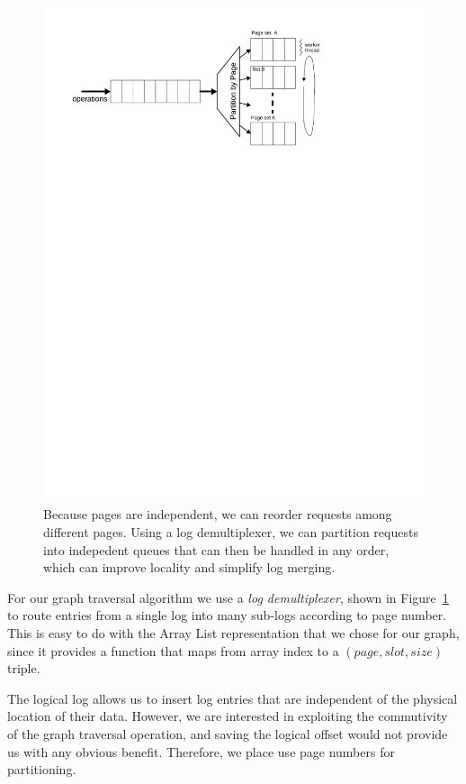 \documentclass[letterpaper,twocolumn,english]{article}
\begin{document}
\begin{figure}
\includegraphics[width=1\columnwidth]{graph-traversal.pdf}
\caption{\sf\label{fig:multiplexor} Because pages are independent, we can reorder requests among different pages. Using a log demultiplexer, we can partition requests into indepedent queues that can then be handled in any order, which can improve locality and simplify log merging.}
\end{figure}

For our graph traversal algorithm we use a {\em log demultiplexer},
shown in Figure~\ref{fig:multiplexor} to route entries from a single
log into many sub-logs according to page number.  This is easy to do
with the Array List representation that we chose for our graph, since
it provides a function that maps from
array index to a $(page, slot, size)$ triple.

The logical log allows us to insert log entries that are independent
of the physical location of their data.  However, we are
interested in exploiting the commutivity of the graph traversal
operation, and saving the logical offset would not provide us with any
obvious benefit.  Therefore, we place use page numbers for partitioning.
\end{document}

